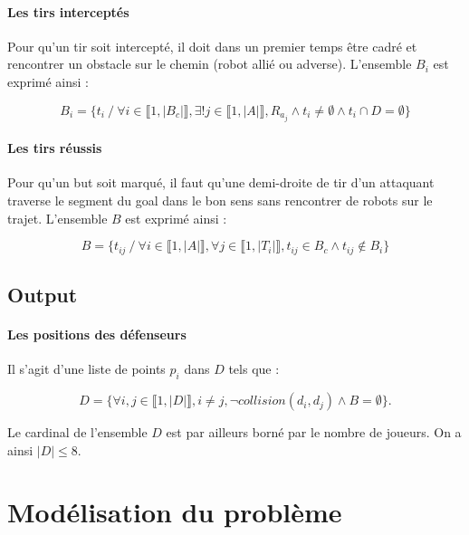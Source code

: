 \documentclass[12pt]{article}
\begin{document}
\paragraph{Les tirs interceptés}
Pour qu'un tir soit intercepté, il doit dans un premier temps être cadré et rencontrer un obstacle sur le chemin (robot allié ou adverse). L'ensemble $B_i$ est exprimé ainsi :

\begin{equation*}
    B_i = \{  t_i \ / \ \forall i \in \llbracket 1, |B_c| \rrbracket, \exists ! j \in \llbracket 1, |A| \rrbracket, R_{a_j} \wedge t_i \ne \emptyset \wedge t_i \cap D = \emptyset \}
\end{equation*}



\paragraph{Les tirs réussis}
Pour qu'un but soit marqué, il faut qu'une demi-droite de tir d'un attaquant traverse le segment du goal dans le bon sens sans rencontrer de robots sur le trajet. L'ensemble $B$ est exprimé ainsi :

\begin{equation*}
    B = \{t_{ij} \ / \ \forall i \in \llbracket 1, |A| \rrbracket, \forall j \in \llbracket 1, |T_i| \rrbracket, t_{ij}  \in B_c \wedge t_{ij} \notin B_i  \}
\end{equation*}



\subsection{Output}

\paragraph{Les positions des défenseurs} Il s'agit d'une liste de points $p_i$ dans $D$ tels que :

\begin{equation*}
D = \{ \forall i, j \in \llbracket 1, |D| \rrbracket, i \ne j, \neg collision(d_i, d_j) \wedge B = \emptyset \}.
\end{equation*}

Le cardinal de l'ensemble $D$ est par ailleurs borné par le nombre de joueurs. On a ainsi $|D| \leqslant 8$.



\section{Modélisation du problème}
\end{document}
